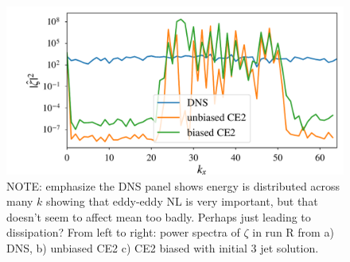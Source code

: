 \documentclass{jfm}
\begin{document}
\begin{figure}
  \centering
  \includegraphics[width=\textwidth]{../../figs/kx_power_spectra_zeta_dns_run_R.pdf}
  \caption{NOTE: emphasize the DNS panel shows energy is distributed across many $k$ showing that eddy-eddy NL is very important, but that doesn't seem to affect mean too badly. Perhaps just leading to dissipation? From left to right: power spectra of $\zeta$ in run R from a) DNS, b) unbiased CE2 c) CE2 biased with initial 3 jet solution.}
  \label{fig:power_spec_S}
\end{figure}
\end{document}
